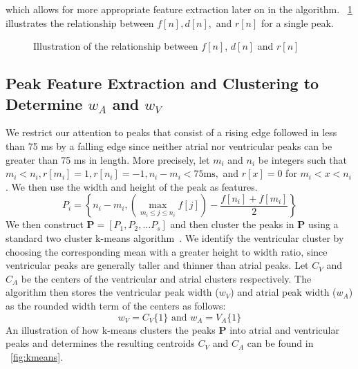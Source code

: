 \documentclass[conference]{IEEEtran}
\newcommand{\APW}{\ensuremath{w_A}}
\newcommand{\VPW}{\ensuremath{w_V}}
\begin{document}
 which allows for more appropriate feature extraction later on in the algorithm.
\figurename~\ref{fig:fwr} illustrates the relationship between $f[n], d[n], $ and $r[n]$ for a single peak.
\begin{figure}
	\centering
	\caption{
	Illustration of the relationship between $f[n]$, $d[n]$ and $r[n]$}
	\label{fig:fwr}
\end{figure}

\subsection{Peak Feature Extraction and Clustering to Determine \APW{} and \VPW}
We restrict our attention to peaks that consist of a rising edge
followed in less than 75 ms by a falling edge since 
neither atrial nor ventricular peaks can be greater than 75 ms in length.
More precisely, let $m_i$ and $n_i$ be integers such that $m_i < n_i, r[m_i]=1, r[n_i] = -1, n_i-m_i < 75 \text{ms},$ and $r[x]=0 $ for $m_i < x < n_i$.
We then use the width and height of the peak as features.
\begin{equation*}
	P_i = \left\{n_i-m_i, \left( \max\limits_{m_i\le j\le n_i} f[j] \right) - \frac{f[n_i]+f[m_i]}{2} \right\}
\end{equation*}
 We then construct $\mathbf{P} = [P_1, P_2, \dots P_s]$ and then
cluster the peaks in $\mathbf{P}$ using a standard two cluster k-means
algorithm~\cite{k-means}. 
We identify the ventricular cluster by choosing the corresponding mean 
with a greater height to width ratio, since
ventricular peaks are generally taller and thinner than atrial peaks. Let $C_V$ and $C_A$
be the centers of the ventricular and atrial clusters 
respectively. The algorithm then stores the ventricular
peak width (\VPW) and atrial peak width (\APW) as the
rounded width term of the centers as follows:
\begin{equation*}
	\VPW{}=C_V\{1\} \text{ and } \APW{}=V_A\{1\}
\end{equation*}
An illustration of how k-means clusters the
peaks $\mathbf{P}$ into atrial and ventricular peaks and
determines the resulting centroids $C_V$ and $C_A$ can be
found in  \figurename~\ref{fig:kmeans}.
\end{document}
